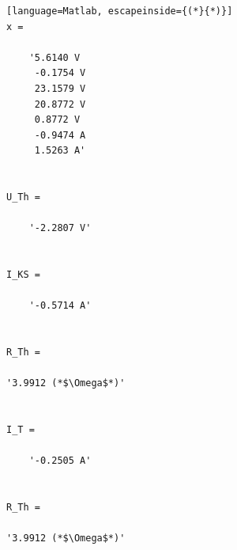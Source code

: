 \documentclass[11pt]{scrartcl}
\begin{document}
\begin{lstlisting}[language=Matlab, escapeinside={(*}{*)}]
x =

    '5.6140 V
     -0.1754 V
     23.1579 V
     20.8772 V
     0.8772 V
     -0.9474 A
     1.5263 A'


U_Th =

    '-2.2807 V'


I_KS =

    '-0.5714 A'


R_Th =

'3.9912 (*$\Omega$*)'


I_T =

    '-0.2505 A'


R_Th =

'3.9912 (*$\Omega$*)'
\end{lstlisting}
\end{document}
